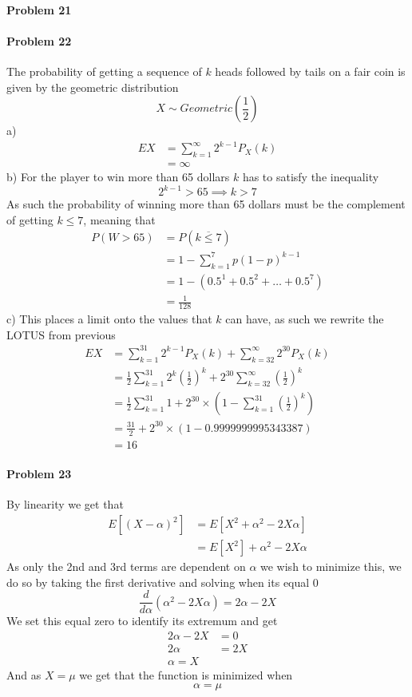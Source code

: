 \paragraph{Problem 21}
\paragraph{Problem 22}
The probability of getting a sequence of $k$ heads followed by tails on a fair coin is given by the geometric distribution
\[
    X\sim Geometric\left(\frac{1}{2}\right)
\]
a)
\begin{align*}
    EX&=\sum_{k=1}^{\infty}2^{k-1}P_{X}(k) \\
      &=\infty
\end{align*}
b)
For the player to win more than 65 dollars $k$ has to satisfy the inequality
\[
    2^{k-1}>65\implies k>7
\]
As such the probability of winning more than 65 dollars must be the complement of getting $k\leq 7$, meaning that
\begin{align*}
    P(W>65)&=P(\overline{k\leq 7}) \\
           &=1-\sum_{k=1}^{7}p(1-p)^{k-1} \\
           &=1-\left(0.5^{1}+0.5^{2}+\ldots+0.5^{7}\right) \\
           &=\frac{1}{128} 
\end{align*}
c)
This places a limit onto the values that $k$ can have, as such we rewrite the LOTUS from previous
\begin{align*}
    EX&=\sum_{k=1}^{31}2^{k-1}P_{X}(k)+\sum_{k=32}^{\infty}2^{30}P_{X}(k) \\
      &=\frac{1}{2}\sum_{k=1}^{31}2^{k}\left(\frac{1}{2}\right)^{k}+2^{30}\sum_{k=32}^{\infty}\left(\frac{1}{2}\right)^{k} \\
      &=\frac{1}{2}\sum_{k=1}^{31}1+2^{30}\times\left(1-\sum_{k=1}^{31}\left(\frac{1}{2}\right)^{k}\right) \\
      &=\frac{31}{2}+2^{30}\times(1-0.9999999995343387) \\
      &=16
\end{align*}
\paragraph{Problem 23}
By linearity we get that
\begin{align*}
    E[(X-\alpha)^{2}]&=E[X^{2}+\alpha^{2}-2X\alpha] \\
             &=E[X^{2}]+\alpha^{2}-2X\alpha
\end{align*}
As only the 2nd and 3rd terms are dependent on $\alpha$ we wish to minimize this, we do so by taking the first derivative and solving when its equal 0
\[
    \frac{d}{d\alpha}(\alpha^{2}-2X\alpha)=2\alpha-2X
\]
We set this equal zero to identify its extremum and get
\begin{align*}
    2\alpha-2X&=0 \\
    2\alpha&=2X \\
    \alpha=X
\end{align*}
And as $X=\mu$ we get that the function is minimized when
\[
    \alpha=\mu
\]
